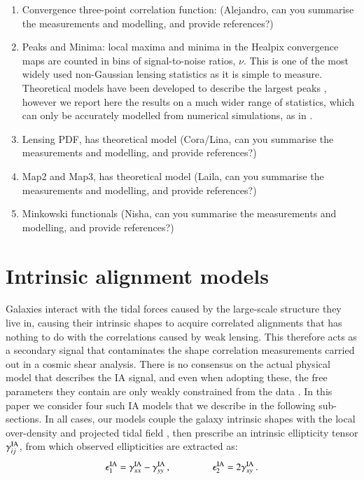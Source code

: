 \documentclass[useAMS,usenatbib]{mn2e}
\begin{document}
\begin{enumerate}
\item Convergence three-point correlation function: (Alejandro, can you summarise the measurements and modelling, and provide references?)
\item Peaks and Minima: local maxima and minima in the {\sc Healpix} convergence maps are counted in bins of signal-to-noise ratios, $\nu$. This is one of the most widely used non-Gaussian lensing statistics as it is simple to measure. Theoretical models have been developed to describe the largest peaks \citep[see][]{Shan18, HSCY1_Peaks_th}, however we report here the results on a much wider range of statistics, which can only be accurately modelled from numerical simulations, as in \citet{HD21, DESY3_Zuercher, HSCY1_Peaks_Sims, HD23}.
\item Lensing PDF, has theoretical model (Cora/Lina, can you summarise the measurements and modelling, and provide references?)
\item Map2 and Map3, has theoretical model  (Laila, can you summarise the measurements and modelling, and provide references?)
\item Minkowski functionals (Nisha, can you summarise the measurements and modelling, and provide references?)
\end{enumerate}

 
 \section{Intrinsic alignment models}
 \label{sec:IA_th}
 
Galaxies interact with the tidal forces caused by the large-scale structure  they live in, causing their intrinsic shapes to acquire correlated alignments that has nothing to do with the correlations caused by weak lensing. This therefore acts as a secondary signal that contaminates the shape correlation measurements carried out in a cosmic shear analysis. There is no consensus on the actual physical model that describes the IA signal, and even when adopting these, the free parameters they contain are only weakly constrained from the data \citep[see][for reviews]{IA_review1, IA_review2}.  %
In this paper we consider four such IA models that we describe in the following sub-sections. In all cases, our models couple the galaxy intrinsic shapes with the local over-density and projected tidal field , then prescribe an intrinsic ellipticity tensor $\gamma_{ij}^{\rm IA}$, from which observed ellipticities are extracted as:
 \begin{eqnarray}
\epsilon_{1}^{\rm IA} = \gamma_{xx}^{\rm IA} - \gamma_{yy}^{\rm IA} \, , \hspace{1.5cm}\epsilon_{2}^{\rm IA} = 2 \gamma_{xy}^{\rm IA}\, .
\label{eq:tidal_th_deltaNLA}
\end{eqnarray}
\end{document}

